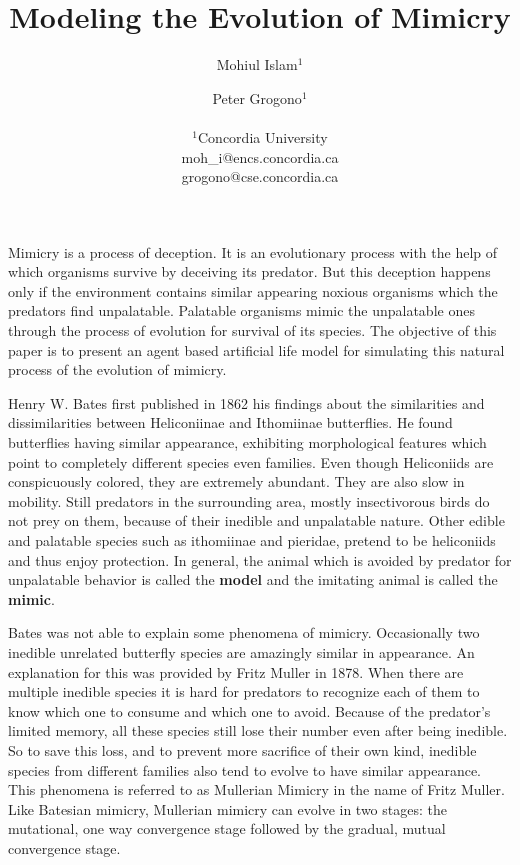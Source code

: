 \documentclass[letterpaper]{article}
\title{Modeling the Evolution of Mimicry}
\author{Mohiul Islam$^{1}$ \and Peter Grogono$^{1}$ \\
\mbox{}\\
$^1$Concordia University  \\
moh\_i@encs.concordia.ca \\
grogono@cse.concordia.ca}
\numberwithin{equation}{section}
\begin{document}
\maketitle

Mimicry is a process of deception. It is an evolutionary process with the help of which organisms survive by deceiving its predator. But this deception happens only if the environment contains similar appearing noxious organisms which the predators find unpalatable. Palatable organisms mimic the unpalatable ones through the process of evolution for survival of its species. The objective of this paper is to present an agent based artificial life model for simulating this natural process of the evolution of mimicry.

Henry W. Bates first published in 1862 his findings about the similarities and dissimilarities between Heliconiinae and Ithomiinae butterflies. He found butterflies having similar appearance, exhibiting morphological features which point to completely different species even families. Even though Heliconiids are conspicuously colored, they are extremely abundant. They are also slow in mobility. Still predators in the surrounding area, mostly insectivorous birds do not prey on them, because of their inedible and unpalatable nature. Other edible and palatable species such as ithomiinae and pieridae, pretend to be heliconiids and thus enjoy protection. In general, the animal which is avoided by predator for unpalatable behavior is called the \textbf{model} and the imitating animal is called the \textbf{mimic}.

Bates was not able to explain some phenomena of mimicry. Occasionally two inedible unrelated butterfly species are amazingly similar in appearance. An explanation for this was provided by Fritz Muller in 1878. When there are multiple inedible species it is hard for predators to recognize each of them to know which one to consume and which one to avoid. Because of the predator's limited memory, all these species still lose their number even after being inedible. So to save this loss, and to prevent more sacrifice of their own kind, inedible species from different families also tend to evolve to have similar appearance. This phenomena is referred to as Mullerian Mimicry in the name of Fritz Muller. Like Batesian mimicry, Mullerian mimicry can evolve in two stages: the mutational, one way convergence stage followed by the gradual, mutual convergence stage.
\end{document}
